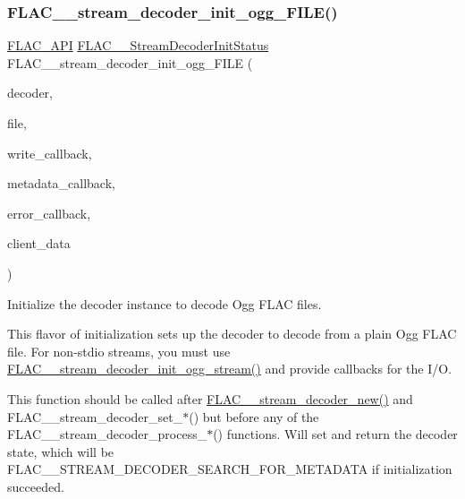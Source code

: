 \subsubsection{\texorpdfstring{F\+L\+A\+C\+\_\+\+\_\+stream\+\_\+decoder\+\_\+init\+\_\+ogg\+\_\+\+F\+I\+L\+E()}{FLAC\_\_stream\_decoder\_init\_ogg\_FILE()}}
{\footnotesize\ttfamily \hyperlink{group__flac__export_ga56ca07df8a23310707732b1c0007d6f5}{F\+L\+A\+C\+\_\+\+A\+PI} \hyperlink{group__flac__stream__decoder_gaaed54a24ac6310d29c5cafba79759c44}{F\+L\+A\+C\+\_\+\+\_\+\+Stream\+Decoder\+Init\+Status} F\+L\+A\+C\+\_\+\+\_\+stream\+\_\+decoder\+\_\+init\+\_\+ogg\+\_\+\+F\+I\+LE (\begin{DoxyParamCaption}\item[{\hyperlink{struct_f_l_a_c_____stream_decoder}{F\+L\+A\+C\+\_\+\+\_\+\+Stream\+Decoder} $\ast$}]{decoder,  }\item[{F\+I\+LE $\ast$}]{file,  }\item[{\hyperlink{group__flac__stream__decoder_ga61e48dc2c0d2f6c5519290ff046874a4}{F\+L\+A\+C\+\_\+\+\_\+\+Stream\+Decoder\+Write\+Callback}}]{write\+\_\+callback,  }\item[{\hyperlink{group__flac__stream__decoder_ga6aa87c01744c1c601b7f371f627b6e14}{F\+L\+A\+C\+\_\+\+\_\+\+Stream\+Decoder\+Metadata\+Callback}}]{metadata\+\_\+callback,  }\item[{\hyperlink{group__flac__stream__decoder_gac896ee6a12668e9015fab4fbc6aae996}{F\+L\+A\+C\+\_\+\+\_\+\+Stream\+Decoder\+Error\+Callback}}]{error\+\_\+callback,  }\item[{\hyperlink{png_8h_ac9c84fa68bbad002983e35ce3663c686}{void} $\ast$}]{client\+\_\+data }\end{DoxyParamCaption})}

Initialize the decoder instance to decode Ogg F\+L\+AC files.

This flavor of initialization sets up the decoder to decode from a plain Ogg F\+L\+AC file. For non-\/stdio streams, you must use \hyperlink{group__flac__stream__decoder_ga78bf285b54e5aaee73a214c108683a72}{F\+L\+A\+C\+\_\+\+\_\+stream\+\_\+decoder\+\_\+init\+\_\+ogg\+\_\+stream()} and provide callbacks for the I/O.

This function should be called after \hyperlink{group__flac__stream__decoder_ga7159eefc074dfbab4a37462f69326091}{F\+L\+A\+C\+\_\+\+\_\+stream\+\_\+decoder\+\_\+new()} and F\+L\+A\+C\+\_\+\+\_\+stream\+\_\+decoder\+\_\+set\+\_\+$\ast$() but before any of the F\+L\+A\+C\+\_\+\+\_\+stream\+\_\+decoder\+\_\+process\+\_\+$\ast$() functions. Will set and return the decoder state, which will be F\+L\+A\+C\+\_\+\+\_\+\+S\+T\+R\+E\+A\+M\+\_\+\+D\+E\+C\+O\+D\+E\+R\+\_\+\+S\+E\+A\+R\+C\+H\+\_\+\+F\+O\+R\+\_\+\+M\+E\+T\+A\+D\+A\+TA if initialization succeeded.

